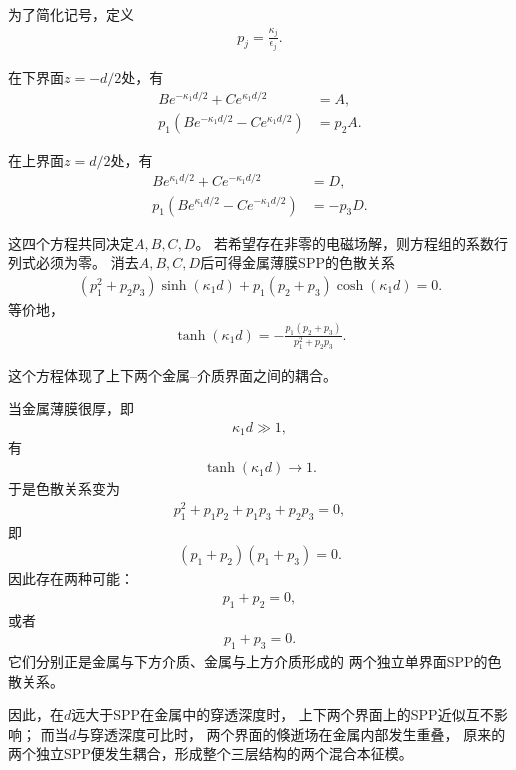 \documentclass{article}
\begin{document}
为了简化记号，定义
\begin{align}
    p_j=\frac{\kappa_j}{\epsilon_j}.
\end{align}

在下界面$z=-d/2$处，有
\begin{align}
    B e^{-\kappa_1d/2}
    +
    C e^{\kappa_1d/2}
    &=A,
\\
    p_1
    \left(
    B e^{-\kappa_1d/2}
    -
    C e^{\kappa_1d/2}
    \right)
    &=p_2A.
\end{align}

在上界面$z=d/2$处，有
\begin{align}
    B e^{\kappa_1d/2}
    +
    C e^{-\kappa_1d/2}
    &=D,
\\
    p_1
    \left(
    B e^{\kappa_1d/2}
    -
    C e^{-\kappa_1d/2}
    \right)
    &=-p_3D.
\end{align}

这四个方程共同决定$A,B,C,D$。
若希望存在非零的电磁场解，则方程组的系数行列式必须为零。
消去$A,B,C,D$后可得金属薄膜SPP的色散关系
\begin{align}
    \left(p_1^2+p_2p_3\right)
    \sinh(\kappa_1d)
    +
    p_1(p_2+p_3)
    \cosh(\kappa_1d)
    =0.
\end{align}
等价地，
\begin{align}
    \tanh(\kappa_1d)
    =
    -
    \frac{p_1(p_2+p_3)}
    {p_1^2+p_2p_3}.
\end{align}

这个方程体现了上下两个金属--介质界面之间的耦合。

当金属薄膜很厚，即
\begin{align}
    \kappa_1d\gg1,
\end{align}
有
\begin{align}
    \tanh(\kappa_1d)\rightarrow1.
\end{align}
于是色散关系变为
\begin{align}
    p_1^2+p_1p_2+p_1p_3+p_2p_3=0,
\end{align}
即
\begin{align}
    (p_1+p_2)(p_1+p_3)=0.
\end{align}
因此存在两种可能：
\begin{align}
    p_1+p_2=0,
\end{align}
或者
\begin{align}
    p_1+p_3=0.
\end{align}
它们分别正是金属与下方介质、金属与上方介质形成的
两个独立单界面SPP的色散关系。

因此，在$d$远大于SPP在金属中的穿透深度时，
上下两个界面上的SPP近似互不影响；
而当$d$与穿透深度可比时，
两个界面的倏逝场在金属内部发生重叠，
原来的两个独立SPP便发生耦合，形成整个三层结构的两个混合本征模。
\end{document}

